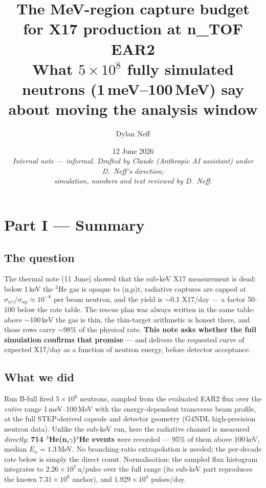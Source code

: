 \documentclass[11pt,a4paper]{article}
\title{\vspace{-1.2cm}
  {\Large\bfseries The MeV-region capture budget for X17 production at n\_TOF EAR2}\\[2mm]
  {\large What $5\times10^{8}$ fully simulated neutrons (1\,meV--100\,MeV)
   say about moving the analysis window}}
\author{Dylan Neff}
\date{12 June 2026 \\[2mm]
  {\small\itshape Internal note --- informal. Drafted by Claude (Anthropic AI
  assistant) under D.~Neff's direction; \\ simulation, numbers and text
  reviewed by D.~Neff.}}
\newcommand{\He}[1]{$^{#1}$He}
\newcommand{\snp}{\sigma_{np}}
\newcommand{\sng}{\sigma_{n\gamma}}
\begin{document}
\maketitle

\begin{center}
\end{center}

\section*{Part I --- Summary}

\subsection*{The question}
The thermal note (11 June) showed that the sub-keV X17 measurement is dead:
below 1\,keV the \He{3} gas is opaque to (n,p)t, radiative captures are
capped at $\sng/\snp\approx10^{-8}$ per beam neutron, and the yield is
$\sim$0.1 X17/day --- a factor 50--100 below the rate table. The rescue plan
was always written in the same table: above $\sim$100\,keV the gas is thin,
the thin-target arithmetic is honest there, and those rows carry $\sim$98\%
of the physical rate. \textbf{This note asks whether the full simulation
confirms that promise} --- and delivers the requested curve of expected
X17/day as a function of neutron energy, before detector acceptance.

\subsection*{What we did}
Run B-full fired $5\times10^{8}$ neutrons, sampled from the evaluated EAR2
flux over the \emph{entire} range 1\,meV--100\,MeV with the energy-dependent
transverse beam profile, at the full STEP-derived capsule and detector
geometry (G4NDL high-precision neutron data). Unlike the sub-keV run, here
the radiative channel is measured \emph{directly}: \textbf{714
\He{3}(n,$\gamma$)\He{4} events} were recorded --- 95\% of them above
100\,keV, median $E_n = 1.3$\,MeV. No branching-ratio extrapolation is
needed; the per-decade rate below is simply the direct count.
Normalisation: the sampled flux histogram integrates to
$2.26\times10^{7}$\,n/pulse over the full range (its sub-keV part reproduces
the known $7.31\times10^{6}$ anchor), and $1.929\times10^{4}$ pulses/day.
\end{document}
